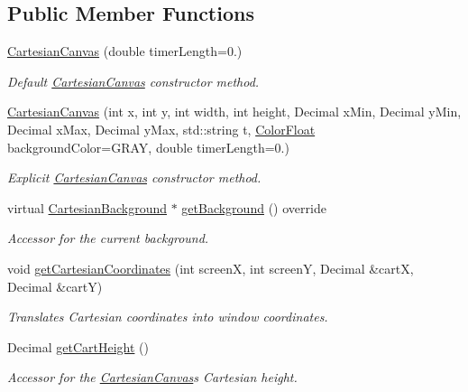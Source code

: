 \subsection*{Public Member Functions}
\begin{DoxyCompactItemize}
\item 
\hyperlink{classtsgl_1_1_cartesian_canvas_a4438f368eae3def6a70e0faa15d28daa}{Cartesian\+Canvas} (double timer\+Length=0.)
\begin{DoxyCompactList}\small\item\em Default \hyperlink{classtsgl_1_1_cartesian_canvas}{Cartesian\+Canvas} constructor method. \end{DoxyCompactList}\item 
\hyperlink{classtsgl_1_1_cartesian_canvas_a15e3b3f68da5d76c2c8644ec8de8ab8f}{Cartesian\+Canvas} (int x, int y, int width, int height, Decimal x\+Min, Decimal y\+Min, Decimal x\+Max, Decimal y\+Max, std\+::string t, \hyperlink{structtsgl_1_1_color_float}{Color\+Float} background\+Color=G\+R\+AY, double timer\+Length=0.)
\begin{DoxyCompactList}\small\item\em Explicit \hyperlink{classtsgl_1_1_cartesian_canvas}{Cartesian\+Canvas} constructor method. \end{DoxyCompactList}\item 
virtual \hyperlink{classtsgl_1_1_cartesian_background}{Cartesian\+Background} $\ast$ \hyperlink{classtsgl_1_1_cartesian_canvas_ad0833d6659071cae7c2ec80d784b1a67}{get\+Background} () override
\begin{DoxyCompactList}\small\item\em Accessor for the current background. \end{DoxyCompactList}\item 
void \hyperlink{classtsgl_1_1_cartesian_canvas_a736935074bb6d90bcc0c7af2edd8a4aa}{get\+Cartesian\+Coordinates} (int screenX, int screenY, Decimal \&cartX, Decimal \&cartY)
\begin{DoxyCompactList}\small\item\em Translates Cartesian coordinates into window coordinates. \end{DoxyCompactList}\item 
Decimal \hyperlink{classtsgl_1_1_cartesian_canvas_a66657636eaf20ff465898d3f932063ce}{get\+Cart\+Height} ()
\begin{DoxyCompactList}\small\item\em Accessor for the \hyperlink{classtsgl_1_1_cartesian_canvas}{Cartesian\+Canvas}\textquotesingle{}s Cartesian height. \end{DoxyCompactList}\item 

\end{DoxyCompactItemize}
